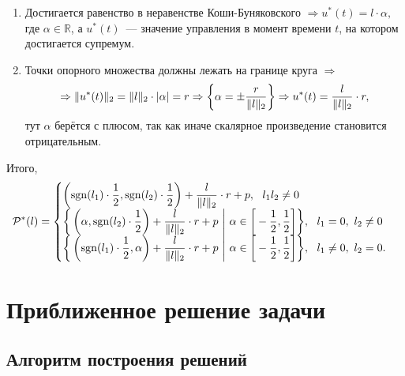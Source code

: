 \documentclass[a4paper,11pt]{article}
\begin{document}
\begin{enumerate}
\begin{enumerate}
\item Достигается равенство в неравенстве Коши-Буняковского $\Rightarrow u^{*}(t) = l \cdot \alpha,$ где $\alpha \in \mathbb{R} $, а $u^{*}(t)$~--- значение управления в момент времени $t$, на котором достигается супремум.
\item Точки опорного множества должны лежать на границе круга $\Rightarrow$ \[ \Rightarrow \| u^{*}(t) \|_2 = \| l \|_2 \cdot |\alpha| = r \Rightarrow  \bigg{\{} \alpha = \pm \frac{r}{\| l \|_2} \bigg{\}} \Rightarrow u^{*}(t) = \frac{l}{\| l \|_2} \cdot r, \]
тут $\alpha$ берётся с плюсом, так как иначе скалярное произведение становится отрицательным.
\end{enumerate}
Итого, $$ \mathcal{P}^{*}(l) =
\begin{cases}
\left( \mathrm{sgn}(l_1) \cdot \dfrac{1}{2}, \mathrm{sgn}(l_2) \cdot \dfrac{1}{2} \right) + \dfrac{l}{\| l \|_2} \cdot r + p, \ \ l_1 l_2 \neq 0 \\ 
\bigg{\{} \left( \alpha, \mathrm{sgn}(l_2) \cdot \dfrac{1}{2} \right) + \dfrac{l}{\| l \|_2} \cdot r + p \  \bigg{|} \ \alpha \in \bigg{[} -\dfrac{1}{2},\dfrac{1}{2} \bigg{]} \bigg{\}}, \ \ l_1 = 0, \ l_2 \neq 0 \\
\bigg{\{} \left( \mathrm{sgn}(l_1) \cdot \dfrac{1}{2}, \alpha \right) + \dfrac{l}{\| l \|_2} \cdot r + p \  \bigg{|} \ \alpha \in \bigg{[} -\dfrac{1}{2},\dfrac{1}{2} \bigg{]} \bigg{\}}, \ \ l_1 \neq 0, \ l_2 = 0.
\end{cases} $$
\end{enumerate}

\section{Приближенное решение задачи}

\subsection{Алгоритм построения решений}
\end{document}

